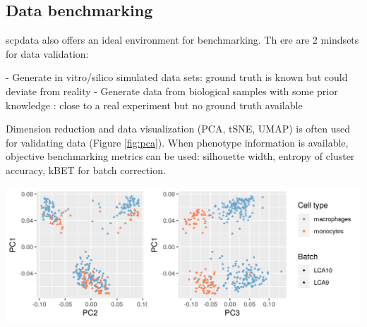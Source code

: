 \documentclass{article}
\newcommand{\hcode}[2][lgray]{{\ttfamily\color{vdgray}\colorbox{#1}{#2}}}
\begin{document}
\begin{multicols}{2}
\begin{minipage}[t]{\linewidth}
\end{minipage}



\noindent
\begin{minipage}[t]{\linewidth}
  \vspace{0.55cm}
  \section*{\huge Data benchmarking}
  \large
  
  \hcode{scpdata} also offers an ideal environment for benchmarking. 
  Th  ere are 2 mindsets for data validation:
  
  - Generate in vitro/silico simulated data sets: ground truth is known but could deviate from reality
  - Generate data from biological samples with some prior knowledge : close to a real experiment but no ground truth available
  
  Dimension reduction and data visualization (PCA, tSNE, UMAP) is often used for validating data (Figure \ref{fig:pca}). When phenotype information is available, objective benchmarking metrics can be used: silhouette width, entropy of cluster accuracy, kBET for batch correction. 

  \centering
    \includegraphics[width=\textwidth]{figs/PCA.png}
  \label{fig:pca}

\end{minipage}


\end{multicols}
\end{document}
